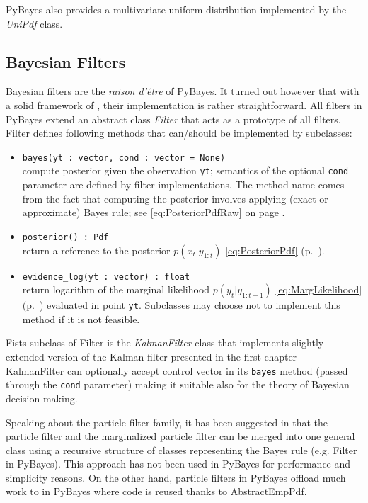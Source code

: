 PyBayes also provides a multivariate uniform distribution implemented by the \emph{UniPdf} class.

\subsection{Bayesian Filters}

Bayesian filters are the \emph{raison d'être} of PyBayes. It turned out however that with a solid
framework of {\pdfs}, their implementation is rather straightforward. All filters in PyBayes extend
an abstract class \emph{Filter} that acts as a prototype of all filters. Filter defines following
methods that can/should be implemented by subclasses:
\begin{itemize}
	\item \verb|bayes(yt : vector, cond : vector = None)| \\
		compute posterior {\pdf} given
		the observation \verb|yt|; semantics of the optional \verb|cond| parameter are defined
		by filter implementations. The method name comes from the fact that computing the posterior
		{\pdf} involves applying (exact or approximate) Bayes rule; see \eqref{eq:PosteriorPdfRaw}
		on page \pageref{eq:PosteriorPdfRaw}.
	\item \verb|posterior() : Pdf| \\
		return a reference to the posterior {\pdf} \(p(x_t | y_{1:t})\) \eqref{eq:PosteriorPdf}
		(p.~\pageref{eq:PosteriorPdf}).
	\item \verb|evidence_log(yt : vector) : float| \\
		return logarithm of the marginal likelihood \(p(y_t | y_{1:t-1})\) \eqref{eq:MargLikelihood}
		(p.~\pageref{eq:MargLikelihood}) evaluated in point \verb|yt|. Subclasses may choose not to
		implement this method if it is not feasible.
\end{itemize}
Fists subclass of Filter is the \emph{KalmanFilter} class that implements slightly extended version
of the Kalman filter presented in the first chapter --- KalmanFilter can optionally accept control
vector in its \verb|bayes| method (passed through the \verb|cond| parameter) making it suitable also
for the theory of Bayesian decision-making.

Speaking about the particle filter family, it has been suggested in \cite{Smi:10} that the particle
filter and the marginalized particle filter can be merged into one general class using a recursive
structure of classes representing the Bayes rule (e.g. Filter in PyBayes). This approach has not
been used in PyBayes for performance and simplicity reasons. On the other hand, particle filters in
PyBayes offload much work to {\pdfs} in PyBayes where code is reused thanks to AbstractEmpPdf.

